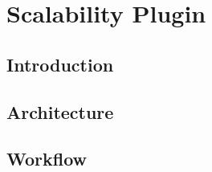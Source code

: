 \section{Scalability Plugin}

\subsection{Introduction}
\subsection{Architecture}
\subsection{Workflow}
